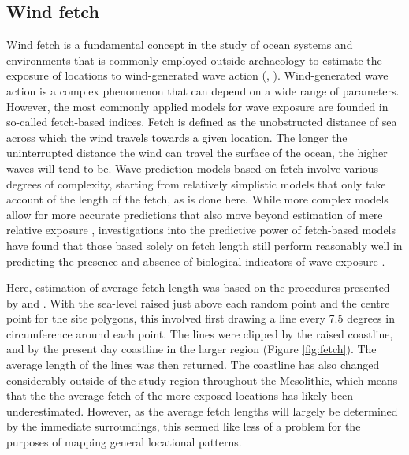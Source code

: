 \documentclass[12pt, a4paper]{article}
\begin{document}
\subsection{Wind fetch} 
Wind fetch is a fundamental concept in the study of ocean systems and environments that is commonly employed outside archaeology to estimate the exposure of locations to wind-generated wave action (\citealp[][]{laing1998}, \citealp[for archaeological applications see][]{nitter2013, nitter2018}). Wind-generated wave action is a complex phenomenon that can depend on a wide range of parameters. However, the most commonly applied models for wave exposure are founded in so-called fetch-based indices. Fetch is defined as the unobstructed distance of sea across which the wind travels towards a given location. The longer the uninterrupted distance the wind can travel the surface of the ocean, the higher waves will tend to be. Wave prediction models based on fetch involve various degrees of complexity, starting from relatively simplistic models that only take account of the length of the fetch, as is done here. While more complex models allow for more accurate predictions that also move beyond estimation of mere relative exposure \citep{malhotra2007, bekkby2008, sundblad2014}, investigations into the predictive power of fetch-based models have found that those based solely on fetch length still perform reasonably well in predicting the presence and absence of biological indicators of wave exposure \citep{burrows2008, hill2010}. \par
Here, estimation of average fetch length was based on the procedures presented by \cite{ekebom2003} and \cite{tolvanen2005}. With the sea-level raised just above each random point and the centre point for the site polygons, this involved first drawing a line every 7.5 degrees in circumference around each point. The lines were clipped by the raised coastline, and by the present day coastline in the larger region (Figure \ref{fig:fetch}). The average length of the lines was then returned. The coastline has also changed considerably outside of the study region throughout the Mesolithic, which means that the the average fetch of the more exposed locations has likely been underestimated. However, as the average fetch lengths will largely be determined by the immediate surroundings, this seemed like less of a problem for the purposes of mapping general locational patterns. \par
\end{document}
